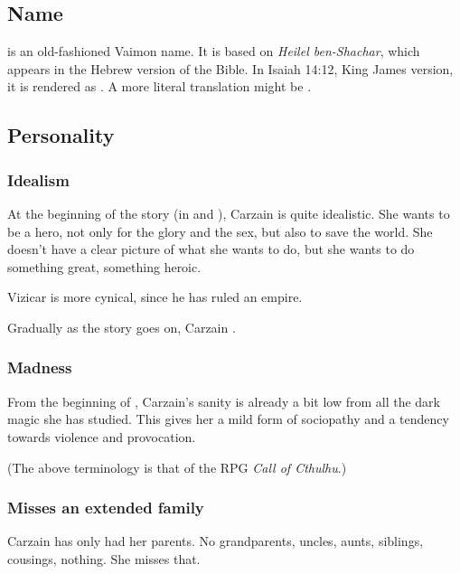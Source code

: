 \subsection{Name}
\emph{\Shachar} is an old-fashioned Vaimon name. 
It is based on \emph{Heilel ben-Shachar}, which appears in the Hebrew version of the Bible. 
In Isaiah 14:12, King James version, it is rendered as . 
A more literal translation might be .









\subsection{Personality}





\subsubsection{Idealism}
At the beginning of the story (in \emph{\TwilightAngelRemember{}} and \emph{\CarzainWithRedcorBook{}}), Carzain is quite idealistic. 
She wants to be a hero, not only for the glory and the sex, but also to save the world. 
She doesn't have a clear picture of what she wants to do, but she wants to do something great, something heroic. 

Vizicar is more cynical, since he has ruled an empire. 

Gradually as the story goes on, Carzain . 





\subsubsection{Madness}
From the beginning of \emph{\TwilightAngelRemember{}}, Carzain's sanity is already a bit low from all the dark \nieur{} magic she has studied. 
This gives her a mild form of sociopathy and a tendency towards violence and provocation. 

(The above terminology is that of the RPG \emph{Call of Cthulhu}.)





\subsubsection{Misses an extended family}
Carzain has only had her parents. 
No grandparents, uncles, aunts, siblings, cousings, nothing. 
She misses that. 





